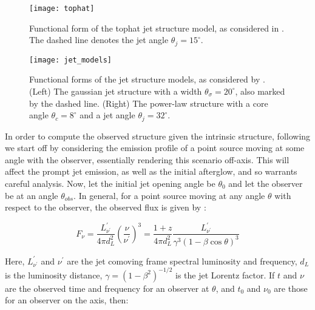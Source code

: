 \begin{itemize}
    \end{itemize}

    \begin{figure}[H]
        \centering
        \texttt{[image: tophat]}
        \caption[Tophat jet structure model]{
                    Functional form of the tophat jet structure model, as considered in
                    \cite{saleem_2020b}. The dashed line denotes the jet angle
                    $\theta_j = 15^{\circ}$.
             }
        \label{fig:tophat}
    \end{figure}

    \begin{figure}[H]
        \centering
        \texttt{[image: jet\_models]}
        \caption[Jet structures as in \cite{hayes_2020}]{
                    Functional forms of the jet structure models, as considered by
                    \cite{hayes_2020}. (Left) The gaussian jet structure with
                    a width $\theta_{\sigma} = 20^{\circ}$, also marked by the dashed
                    line. (Right) The power-law structure with a core angle $\theta_c =
                    8^\circ$ and a jet angle $\theta_j = 32^\circ$.
             }
        \label{fig:jet_models}
    \end{figure}

    In order to compute the observed structure given the intrinsic structure, following
    \cite{granot_2002} we start off by considering the emission profile of a
    point source moving at some angle with the observer, essentially rendering this
    scenario off-axis. This will affect the prompt jet emission, as well as the initial
    afterglow, and so warrants careful analysis.  Now, let the initial jet opening angle
    be $\theta_0$ and let the observer be at an angle $\theta_{obs}$. In general, for a
    point source moving at any angle $\theta$ with respect to the observer, the observed
    flux is given by :

    \begin{equation}
        \label{eq:1}
        F_{\nu} =
           \dfrac{L^{\prime}_{\nu^{\prime}}}{4 \pi d_L^2}
           \left( \dfrac{\nu}{\nu^\prime}\right)^3
                =
            \dfrac{1 + z}{4 \pi d_L^2}
            \dfrac{L^{\prime}_{\nu^{\prime}}}{\gamma^3 (1 - \beta \cos \theta)^3}
    \end{equation}

    Here, $L^{\prime}_{\nu^{\prime}}$ and $\nu^{\prime}$ are the jet comoving frame
    spectral luminosity and frequency, $d_L$ is the luminosity distance, $\gamma = (1 -
    \beta^2)^{-1/2}$ is the jet Lorentz factor. If $t$ and $\nu$ are the observed time
    and frequency  for an observer at $\theta$, and $t_0$ and $\nu_0$ are those for an
    observer on the axis, then:

